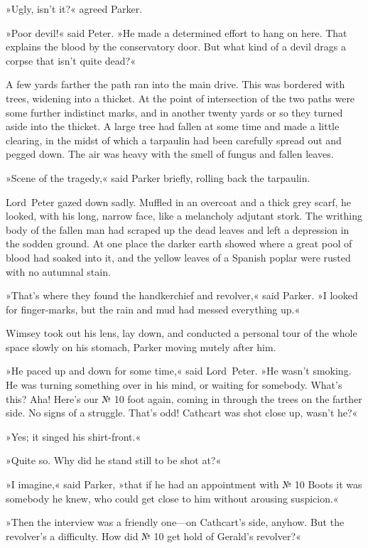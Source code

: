 »Ugly, isn't it?« agreed Parker.

»Poor devil!« said Peter. »He made a determined effort to hang on here. That explains the blood by the conservatory door. But what kind of a devil drags a corpse that isn't quite dead?«

A few yards farther the path ran into the main drive. This was bordered with trees, widening into a thicket. At the point of intersection of the two paths were some further indistinct marks, and in another twenty yards or so they turned aside into the thicket. A large tree had fallen at some time and made a little clearing, in the midst of which a tarpaulin had been carefully spread out and pegged down. The air was heavy with the smell of fungus and fallen leaves.

»Scene of the tragedy,« said Parker briefly, rolling back the tarpaulin.

Lord~Peter gazed down sadly. Muffled in an overcoat and a thick grey scarf, he looked, with his long, narrow face, like a melancholy adjutant stork. The writhing body of the fallen man had scraped up the dead leaves and left a depression in the sodden ground. At one place the darker earth showed where a great pool of blood had soaked into it, and the yellow leaves of a Spanish poplar were rusted with no autumnal stain.

»That's where they found the handkerchief and revolver,« said Parker. »I looked for finger-marks, but the rain and mud had messed everything up.«

Wimsey took out his lens, lay down, and conducted a personal tour of the whole space slowly on his stomach, Parker moving mutely after him.

»He paced up and down for some time,« said Lord~Peter. »He wasn't smoking. He was turning something over in his mind, or waiting for somebody. What's this? Aha! Here's our № 10 foot again, coming in through the trees on the farther side. No signs of a struggle. That's odd! Cathcart was shot close up, wasn't he?«

»Yes; it singed his shirt-front.«

»Quite so. Why did he stand still to be shot at?«

»I imagine,« said Parker, »that if he had an appointment with № 10 Boots it was somebody he knew, who could get close to him without arousing suspicion.«

»Then the interview was a friendly one—on Cathcart's side, anyhow. But the revolver's a difficulty. How did № 10 get hold of Gerald's revolver?«

